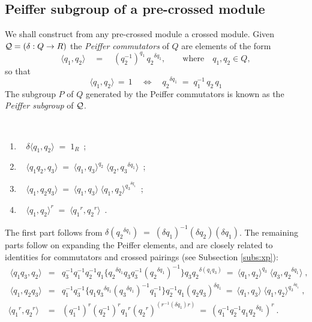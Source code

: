 \newpage
\subsection{Peiffer subgroup of a pre-crossed module} \label{subs:Peiffer}

We shall construct from any pre-crossed module a crossed module. 
Given  $\mathcal{Q} = (\delta : Q \to R)$
the \emph{Peiffer commutators}  of  $Q$  are elements of the form
 
$$
\langle q_1,q_2 \rangle 
\quad=\quad 
(q_2^{-1})^{q_1}\,{q_2}^{\delta q_1},
\qquad \mbox{where} \quad q_1,q_2 \in Q,
$$
so that
$$
\langle q_1,q_2 \rangle \,=\, 1 \quad \Leftrightarrow \quad
{q_2}^{\delta q_1} \;=\; q_1^{-1}\,q_2\,q_1
$$
The subgroup  $P$  of  $Q$  generated by the Peiffer commutators 
is known as the \emph{Peiffer subgroup} of  $\mathcal{Q}$.

\begin{lem} \label{lem:Peiffer}  
\quad\\
\vspace{-5mm}
\begin{enumerate}[{\rm (a)}]
\item~
$\delta \langle q_1,q_2 \rangle \;=\; 1_R$~;
\item~
$\langle q_1q_2,q_3 \rangle \;=\;
\langle q_1,q_3 \rangle^{q_2}\;\langle q_2,{q_3}^{\delta q_1} \rangle$~;
\item~
$\langle q_1,q_2q_3 \rangle \;=\;
\langle q_1,q_3 \rangle\;\langle q_1,q_2\rangle^{{q_3}^{\delta q_1}}$~;
\item~
$\langle q_1, q_2 \rangle^r
\;=\;
\langle {q_1}^r,{q_2}^r \rangle$~.
\end{enumerate}
\end{lem}
\begin{pf}
The first part follows from  
$\delta({q_2}^{\delta q_1}) \;=\; 
(\delta q_1)^{-1}(\delta q_2)(\delta q_1)$.
The remaining parts follow on expanding the Peiffer elements,
and are closely related to identities for commutators and
crossed pairings (see Subsection \ref{subs:xp}):
\begin{eqnarray*}
~\langle q_1q_3,q_2 \rangle  & = & 
q_3^{-1}q_1^{-1}q_2^{-1}q_1
\{{q_2}^{\delta q_1} q_3 q_3^{-1} ({q_2}^{\delta q_1})^{-1}\}
q_3 {q_2}^{\delta(q_1q_3)} ~=~
\langle q_1,q_2 \rangle ^{q_3}\;\langle q_3, {q_2}^{\delta q_1} \rangle \;, \\
~\langle q_1,q_2q_3 \rangle  & = &
q_1^{-1}q_3^{-1}
\{q_1 {q_3}^{\delta q_1} ({q_3}^{\delta q_1})^{-1} q_1^{-1}\}
q_2^{-1} q_1 (q_2 q_3)^{\delta q_1} ~=~
\langle q_1,q_3 \rangle \;
\langle q_1,q_2 \rangle ^{{q_3}^{\delta q_1}} \;, \\
\langle {q_1}^r,{q_2}^r \rangle & = & 
(q_1^{-1})^r (q_2^{-1})^r {q_1}^r ({q_2}^r)^{(r^{-1}(\delta q_1)r)} ~=~ 
(q_1^{-1} q_2^{-1} q_1 {q_2}^{\delta q_1})^r ~. 
\end{eqnarray*}
\end{pf}

